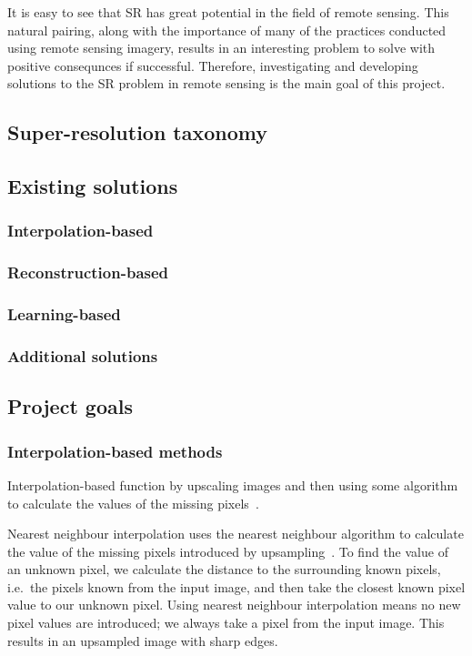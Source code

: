 It is easy to see that SR has great potential in the field of remote sensing. This natural pairing, along with the importance of many of the practices conducted using remote sensing imagery, results in an interesting problem to solve with positive consequnces if successful. Therefore, investigating and developing solutions to the SR problem in remote sensing is the main goal of this project.

\subsection{Super-resolution taxonomy}

\subsection{Existing solutions}
\subsubsection{Interpolation-based}
\subsubsection{Reconstruction-based}
\subsubsection{Learning-based}
\subsubsection{Additional solutions}
\subsection{Project goals}

\subsubsection{Interpolation-based methods}
Interpolation-based function by upscaling images and then using some algorithm to calculate the values of the missing pixels~\cite{interpolation}.

Nearest neighbour interpolation uses the nearest neighbour algorithm to calculate the value of the missing pixels introduced by upsampling~\cite{nnInterpolation}. To find the value of an unknown pixel, we calculate the distance to the surrounding known pixels, i.e.\ the pixels known from the input image, and then take the closest known pixel value to our unknown pixel. Using nearest neighbour interpolation means no new pixel values are introduced; we always take a pixel from the input image. This results in an upsampled image with sharp edges.

